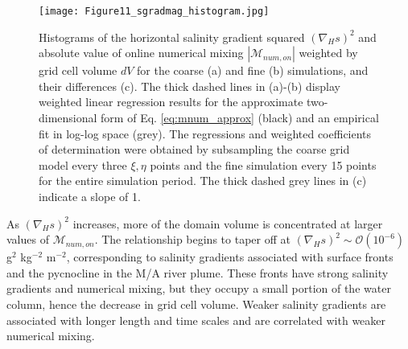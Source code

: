 \documentclass[draft]{agujournal2019}
\begin{document}
\begin{figure}[ht!]
 \centerline{\texttt{[image: Figure11\_sgradmag\_histogram.jpg]}}
  \caption{Histograms of the horizontal salinity gradient squared $(\nabla_H s)^2$ and absolute value of online numerical mixing $|\mathcal{M}_{num, on}|$ weighted by grid cell volume $dV$ for the coarse (a) and fine (b) simulations, and their differences (c). The thick dashed lines in (a)-(b) display weighted linear regression results for the approximate two-dimensional form of Eq. \ref{eq:mnum_approx} (black) and an empirical fit in log-log space (grey). The regressions and weighted coefficients of determination were obtained by subsampling the coarse grid model every three $\xi,\eta$ points and the fine simulation every 15 points for the entire simulation period. The thick dashed grey lines in (c) indicate a slope of 1.}
  \label{fig:mnum_sgrad}
\end{figure}

As $(\nabla_H s)^2$ increases, more of the domain volume is concentrated at larger values of $\mathcal{M}_{num, on}$. The relationship begins to taper off at $(\nabla_H s)^2 \sim \mathcal{O}(10^{-6})$ g$^2$ kg$^{-2}$ m$^{-2}$, corresponding to salinity gradients associated with surface fronts and the pycnocline in the M/A river plume. These fronts have strong salinity gradients and numerical mixing, but they occupy a small portion of the water column, hence the decrease in grid cell volume. Weaker salinity gradients are associated with longer length and time scales and are correlated with weaker numerical mixing. 
\end{document}
